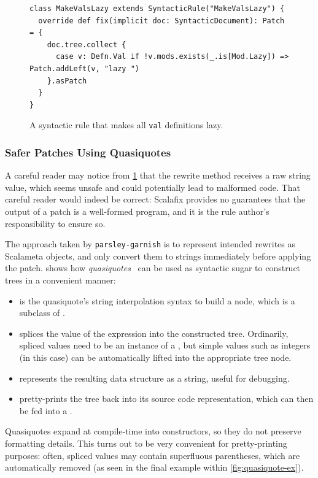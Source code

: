 \documentclass[../../main.tex]{subfiles}
\begin{document}
\begin{figure}[htbp]
\begin{verbatim}
class MakeValsLazy extends SyntacticRule("MakeValsLazy") {
  override def fix(implicit doc: SyntacticDocument): Patch = {
    doc.tree.collect {
      case v: Defn.Val if !v.mods.exists(_.is[Mod.Lazy]) => Patch.addLeft(v, "lazy ")
    }.asPatch
  }
}
\end{verbatim}
\caption{A syntactic rule that makes all \texttt{val} definitions lazy.}
\label{fig:syntactic-rule-ex}
\end{figure}

\subsubsection{Safer Patches Using Quasiquotes}
A careful reader may notice from \cref{fig:syntactic-rule-ex} that the  rewrite method receives a raw string value, which seems unsafe and could potentially lead to malformed code.
That careful reader would indeed be correct:
Scalafix provides no guarantees that the output of a patch is a well-formed program, and it is the rule author's responsibility to ensure so.

The approach taken by \texttt{parsley-garnish} is to represent intended rewrites as Scalameta  objects, and only convert them to strings immediately before applying the patch.
 shows how \emph{quasiquotes}~\cite{shabalin_quasiquotes_2013} can be used as syntactic sugar to construct trees in a convenient manner:
\begin{itemize}
  \item {} is the quasiquote's string interpolation syntax to build a  node, which is a subclass of .
  \item {} splices the value of the expression  into the constructed tree. Ordinarily, spliced values need to be an instance of a , but simple values such as integers (in this case) can be automatically lifted into the appropriate tree node.
  \item {} represents the resulting  data structure as a string, useful for debugging.
  \item {} pretty-prints the tree back into its source code representation, which can then be fed into a .
\end{itemize}
Quasiquotes expand at compile-time into  constructors, so they do not preserve formatting details.
This turns out to be very convenient for pretty-printing purposes: often, spliced values may contain superfluous parentheses, which are automatically removed (as seen in the final example within \cref{fig:quasiquote-ex}).
\end{document}
